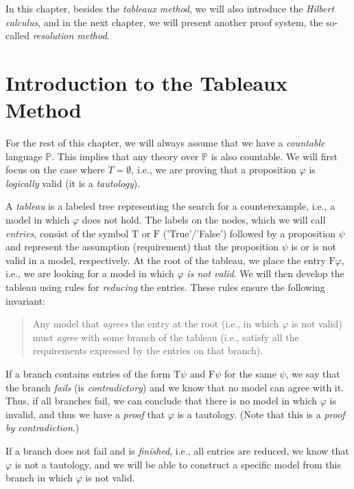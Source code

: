 In this chapter, besides the \emph{tableaux method}, we will also introduce the \emph{Hilbert calculus}, and in the next chapter, we will present another proof system, the so-called \emph{resolution method}.

\section{Introduction to the Tableaux Method}

For the rest of this chapter, we will always assume that we have a \emph{countable} language $\mathbb{P}$. This implies that any theory over $\mathbb{P}$ is also countable. We will first focus on the case where $T = \emptyset$, i.e., we are proving that a proposition $\varphi$ is \emph{logically} valid (it is a \emph{tautology}). 

A \emph{tableau} is a labeled tree representing the search for a counterexample, i.e., a model in which $\varphi$ does not hold. The labels on the nodes, which we will call \emph{entries}, consist of the symbol $\mathrm{T}$ or $\mathrm{F}$ ('True'/'False') followed by a proposition $\psi$ and represent the assumption (requirement) that the proposition $\psi$ is or is not valid in a model, respectively. At the root of the tableau, we place the entry $\mathrm{F}\varphi$, i.e., we are looking for a model in which $\varphi$ \emph{is not valid}. We will then develop the tableau using rules for \emph{reducing} the entries. These rules ensure the following invariant:
\begin{quote}
    Any model that \emph{agrees} the entry at the root (i.e., in which $\varphi$ is not valid) must \emph{agree} with some branch of the tableau (i.e., satisfy all the requirements expressed by the entries on that branch).
\end{quote}
If a branch contains entries of the form $\mathrm{T}\psi$ and $\mathrm{F}\psi$ for the same $\psi$, we say that the branch \emph{fails} (is \emph{contradictory}) and we know that no model can agree with it. Thus, if all branches fail, we can conclude that there is no model in which $\varphi$ is invalid, and thus we have a \emph{proof} that $\varphi$ is a tautology. (Note that this is a \emph{proof by contradiction}.)

If a branch does not fail and is \emph{finished}, i.e., all entries are reduced, we know that $\varphi$ is not a tautology, and we will be able to construct a specific model from this branch in which $\varphi$ is not valid.

